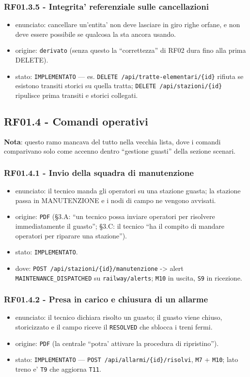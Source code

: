 \documentclass[11pt]{article}
\begin{document}
\subsubsection{RF01.3.5 - Integrita' referenziale sulle cancellazioni}
\label{sec:org4139114}
\begin{itemize}
\item enunciato: cancellare un'entita' non deve lasciare in giro righe orfane, e non deve essere
possibile se qualcosa la sta ancora usando.
\item origine: \texttt{derivato} (senza questo la ``correttezza'' di RF02 dura fino alla prima DELETE).
\item stato: \texttt{IMPLEMENTATO} — es. \texttt{DELETE /api/tratte-elementari/\{id\}} rifiuta se esistono transiti
storici su quella tratta; \texttt{DELETE /api/stazioni/\{id\}} ripulisce prima transiti e storici collegati.
\end{itemize}
\subsection{RF01.4 - Comandi operativi}
\label{sec:orge9f6ef4}

\textbf{Nota}: questo ramo mancava del tutto nella vecchia lista, dove i comandi comparivano solo come
accenno dentro ``gestione guasti'' della sezione scenari.
\subsubsection{RF01.4.1 - Invio della squadra di manutenzione}
\label{sec:org2bbdebb}
\begin{itemize}
\item enunciato: il tecnico manda gli operatori su una stazione guasta; la stazione passa in
MANUTENZIONE e i nodi di campo ne vengono avvisati.
\item origine: \texttt{PDF} (§3.A: ``un tecnico possa inviare operatori per risolvere immediatamente il
guasto''; §3.C: il tecnico ``ha il compito di mandare operatori per riparare una stazione'').
\item stato: \texttt{IMPLEMENTATO}.
\item dove: \texttt{POST /api/stazioni/\{id\}/manutenzione} -> alert \texttt{MAINTENANCE\_DISPATCHED} su \texttt{railway/alerts};
\texttt{M10} in uscita, \texttt{S9} in ricezione.
\end{itemize}
\subsubsection{RF01.4.2 - Presa in carico e chiusura di un allarme}
\label{sec:org98df4c8}
\begin{itemize}
\item enunciato: il tecnico dichiara risolto un guasto; il guasto viene chiuso, storicizzato e il campo
riceve il \texttt{RESOLVED} che sblocca i treni fermi.
\item origine: \texttt{PDF} (la centrale ``potra' attivare la procedura di ripristino'').
\item stato: \texttt{IMPLEMENTATO} — \texttt{POST /api/allarmi/\{id\}/risolvi}, \texttt{M7} + \texttt{M10}; lato treno e' \texttt{T9} che
aggiorna \texttt{T11}.
\end{itemize}
\end{document}
